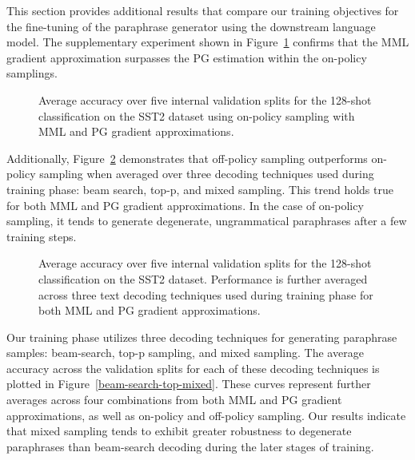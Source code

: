 \documentclass[11pt]{article}
\begin{document}
This section provides additional results that compare our training objectives for the fine-tuning of the paraphrase generator using the downstream language model. The supplementary experiment shown in Figure~\ref{pg-vs-mml-on-policy} confirms that the MML gradient approximation surpasses the PG estimation within the on-policy samplings.

\begin{figure}[h]
\begin{center}

\end{center}
\caption{Average accuracy over five internal validation splits for the 128-shot classification on the SST2 dataset using on-policy sampling with MML and PG gradient approximations.}
\label{pg-vs-mml-on-policy}
\end{figure}

Additionally, Figure~\ref{off-policy-vs-on-policy} demonstrates that off-policy sampling outperforms on-policy sampling when averaged over three decoding techniques used during training phase: beam search, top-p, and mixed sampling. This trend holds true for both MML and PG gradient approximations. In the case of on-policy sampling, it tends to generate degenerate, ungrammatical paraphrases after a few training steps.

\begin{figure}[h]
\begin{center}

\end{center}
\caption{Average accuracy over five internal validation splits for the 128-shot classification on the SST2 dataset. Performance is further averaged across three text decoding techniques used during training phase for both MML and PG gradient approximations.}
\label{off-policy-vs-on-policy}
\end{figure}

Our training phase utilizes three decoding techniques for generating paraphrase samples: beam-search, top-p sampling, and mixed sampling. The average accuracy across the validation splits for each of these decoding techniques is plotted in Figure~\ref{beam-search-top-mixed}. These curves represent further averages across four combinations from both MML and PG gradient approximations, as well as on-policy and off-policy sampling. Our results indicate that mixed sampling tends to exhibit greater robustness to degenerate paraphrases than beam-search decoding during the later stages of training.
\end{document}

